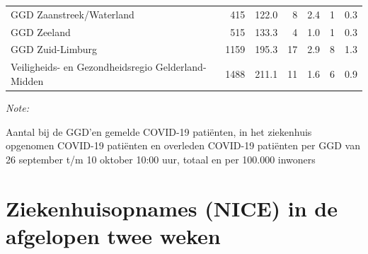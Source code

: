 \documentclass[
  english,
  man,floatsintext]{apa6}
\begin{document}
\begin{table}
\begin{threeparttable}
\begin{tabular}{lrrrrrr}
GGD Zaanstreek/Waterland & 415 & 122.0 & 8 & 2.4 & 1 & 0.3\\
GGD Zeeland & 515 & 133.3 & 4 & 1.0 & 1 & 0.3\\
GGD Zuid-Limburg & 1159 & 195.3 & 17 & 2.9 & 8 & 1.3\\
Veiligheids- en Gezondheidsregio Gelderland-Midden & 1488 & 211.1 & 11 & 1.6 & 6 & 0.9\\
\bottomrule
\end{tabular}
\begin{tablenotes}
\item \textit{Note: } 
\item Aantal bij de GGD’en gemelde COVID-19 patiënten, in het ziekenhuis opgenomen COVID-19 patiënten en overleden COVID-19 patiënten per GGD van 26 september t/m 10 oktober 10:00 uur, totaal en per 100.000 inwoners
\end{tablenotes}
\end{threeparttable}
\endgroup{}
\end{table}

\newpage

\hypertarget{ziekenhuisopnames-nice-in-de-afgelopen-twee-weken}{%
\section{Ziekenhuisopnames (NICE) in de afgelopen twee weken}\label{ziekenhuisopnames-nice-in-de-afgelopen-twee-weken}}
\end{document}
